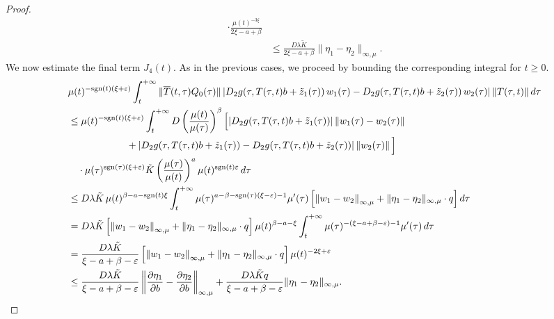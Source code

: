 \documentclass[9pt]{amsart}
\numberwithin{equation}{section}
\numberwithin{lemma}{section}
\begin{document}
\begin{proof}
\begin{align*}
    \cdot \frac{\mu(t)^{-3\xi}}{2\xi - a + \beta} \\
%
&\leq \frac{D \lambda \tilde{K}}{2\xi - a + \beta} 
    \|\eta_1 - \eta_2\|_{\infty,\mu}.
\end{align*}
We now estimate the final term \(J_4(t)\). As in the previous cases, we proceed by bounding the corresponding integral for \(t \geq 0\). 
\begin{align*}
&\mu(t)^{-\textnormal{sgn}(t)(\xi+\varepsilon)} 
\int_t^{+\infty} \|\overline{T}(t,\tau) Q_0(\tau)\| 
\left| D_2g(\tau, T(\tau,t)b + \tilde{z}_1(\tau))\, w_1(\tau)
     - D_2g(\tau, T(\tau,t)b + \tilde{z}_2(\tau))\, w_2(\tau) \right| 
\|T(\tau,t)\| \, d\tau \\
%
&\leq \mu(t)^{-\textnormal{sgn}(t)(\xi+\varepsilon)} 
\int_t^{+\infty} D \left( \frac{\mu(t)}{\mu(\tau)} \right)^{\beta} 
\Big[ |D_2g(\tau, T(\tau,t)b + \tilde{z}_1(\tau))| 
      \left\| w_1(\tau) - w_2(\tau) \right\| \\
&\hspace{6em}
+ |D_2g(\tau, T(\tau,t)b + \tilde{z}_1(\tau)) 
    - D_2g(\tau, T(\tau,t)b + \tilde{z}_2(\tau))| 
    \left\| w_2(\tau) \right\| 
\Big] \\
&\quad \cdot \mu(\tau)^{\textnormal{sgn}(\tau)(\xi+\varepsilon)} 
\tilde{K} \left( \frac{\mu(\tau)}{\mu(t)} \right)^a 
\mu(t)^{\textnormal{sgn}(t)\varepsilon} \, d\tau \\
%
&\leq D \lambda \tilde{K} \, \mu(t)^{\beta - a - \textnormal{sgn}(t)\xi} 
\int_t^{+\infty} \mu(\tau)^{a - \beta - \textnormal{sgn}(\tau)(\xi - \varepsilon) - 1} 
\mu'(\tau) \left[ 
  \left\| w_1 - w_2 \right\|_{\infty,\mu} 
  + \|\eta_1 - \eta_2\|_{\infty,\mu} \cdot q 
\right] d\tau \\
%
&= D \lambda \tilde{K} 
\left[ \left\| w_1 - w_2 \right\|_{\infty,\mu} 
       + \|\eta_1 - \eta_2\|_{\infty,\mu} \cdot q 
\right] 
\mu(t)^{\beta - a - \xi} 
\int_t^{+\infty} \mu(\tau)^{-(\xi - a + \beta - \varepsilon) - 1} 
\mu'(\tau) \, d\tau \\
%
&= \frac{D \lambda \tilde{K}}{\xi - a + \beta - \varepsilon} 
\left[ \left\| w_1 - w_2 \right\|_{\infty,\mu} 
       + \|\eta_1 - \eta_2\|_{\infty,\mu} \cdot q 
\right] \mu(t)^{-2\xi + \varepsilon} \\
%
&\leq \frac{D \lambda \tilde{K}}{\xi - a + \beta - \varepsilon} 
\left\| \frac{\partial \eta_1}{\partial b} 
      - \frac{\partial \eta_2}{\partial b} \right\|_{\infty,\mu}
+ \frac{D \lambda \tilde{K} q}{\xi - a + \beta - \varepsilon} 
\|\eta_1 - \eta_2\|_{\infty,\mu}.
\end{align*}


\end{proof}
\end{document}
